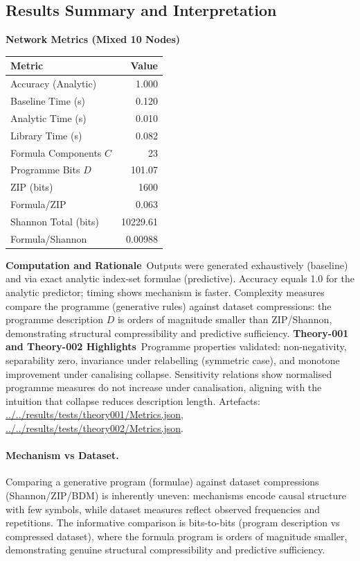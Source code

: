 \documentclass{article}
\begin{document}
\subsection{Results Summary and Interpretation}
\textbf{Network Metrics (Mixed 10 Nodes)}\
\begin{center}
\begin{tabular}{|l|r|}
\hline
Metric & Value \\
\hline
Accuracy (Analytic) & 1.000 \\
Baseline Time (s) & 0.120 \\
Analytic Time (s) & 0.010 \\
Library Time (s) & 0.082 \\
Formula Components $C$ & 23 \\
Programme Bits $D$ & 101.07 \\
ZIP (bits) & 1600 \\
Formula/ZIP & 0.063 \\
Shannon Total (bits) & 10229.61 \\
Formula/Shannon & 0.00988 \\
\hline
\end{tabular}
\end{center}
\textbf{Computation and Rationale}\
Outputs were generated exhaustively (baseline) and via exact analytic index-set formulae (predictive). Accuracy equals 1.0 for the analytic predictor; timing shows mechanism is faster. Complexity measures compare the programme (generative rules) against dataset compressions: the programme description $D$ is orders of magnitude smaller than ZIP/Shannon, demonstrating structural compressibility and predictive sufficiency.
\textbf{Theory-001 and Theory-002 Highlights}\
Programme properties validated: non-negativity, separability zero, invariance under relabelling (symmetric case), and monotone improvement under canalising collapse. Sensitivity relations show normalised programme measures do not increase under canalisation, aligning with the intuition that collapse reduces description length. Artefacts: \url{../../results/tests/theory001/Metrics.json}, \url{../../results/tests/theory002/Metrics.json}.
\paragraph{Mechanism vs Dataset.} Comparing a generative program (formulae) against dataset compressions (Shannon/ZIP/BDM) is inherently uneven: mechanisms encode causal structure with few symbols, while dataset measures reflect observed frequencies and repetitions. The informative comparison is bits-to-bits (program description vs compressed dataset), where the formula program is orders of magnitude smaller, demonstrating genuine structural compressibility and predictive sufficiency.
\end{document}
